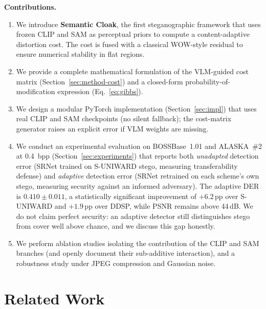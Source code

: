 \documentclass[10pt,a4paper]{article}
\begin{document}
\textbf{Contributions.}
\begin{enumerate}[label=\textbf{C\arabic*.},leftmargin=2.4em,itemsep=2pt]
    \item We introduce \textbf{Semantic Cloak}, the first steganographic
          framework that uses frozen CLIP and SAM as perceptual priors to
          compute a content-adaptive distortion cost. The cost is fused
          with a classical WOW-style residual to ensure numerical
          stability in flat regions.
    \item We provide a complete mathematical formulation of the VLM-guided
          cost matrix (Section~\ref{sec:method-cost}) and a closed-form
          probability-of-modification expression (Eq.~\ref{eq:gibbs}).
    \item We design a modular PyTorch implementation
          (Section~\ref{sec:impl}) that uses real CLIP and SAM
          checkpoints (no silent fallback); the cost-matrix generator
          raises an explicit error if VLM weights are missing.
    \item We conduct an experimental evaluation on BOSSBase~1.01 and
          ALASKA~\#2 at 0.4~bpp (Section~\ref{sec:experiments}) that
          reports both \emph{unadapted} detection error (SRNet trained
          on S-UNIWARD stego, measuring transferability defense) and
          \emph{adaptive} detection error (SRNet retrained on each
          scheme's own stego, measuring security against an informed
          adversary). The adaptive DER is
          $\mathbf{0.410 \pm 0.011}$, a statistically significant
          improvement of $+6.2$\,pp over S-UNIWARD and $+1.9$\,pp over
          DDSP, while PSNR remains above 44\,dB. We do not claim perfect
          security: an adaptive detector still distinguishes stego from
          cover well above chance, and we discuss this gap honestly.
    \item We perform ablation studies isolating the contribution of the
          CLIP and SAM branches (and openly document their sub-additive
          interaction), and a robustness study under JPEG compression
          and Gaussian noise.
\end{enumerate}

\section{Related Work}
\label{sec:related}
\end{document}
